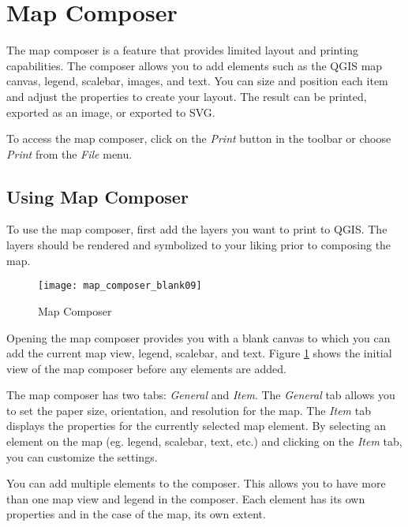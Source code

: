 
\section{Map Composer}\label{label_mapcomposer}

The map composer is a feature that provides limited layout and printing
capabilities. The composer allows you to add elements such as the QGIS map
canvas, legend, scalebar, images, and text. You can size and position each item and
adjust the properties to create your layout. The result can be printed,
exported as an image, or exported to SVG.

To access the map composer, click on the \textit{Print} button in the toolbar
or choose \textit{Print} from the \textit{File} menu.

\subsection{Using Map Composer}\label{label_usemapcomposer} 

To use the map composer, first add the layers you
want to print to QGIS. The layers should be rendered and symbolized to your
liking prior to composing the map. 

\begin{figure}[ht]
   \begin{center}
   \caption{Map Composer}\label{fig:map_composer_blank}\smallskip
   \texttt{[image: map\_composer\_blank09]}
\end{center}  
\end{figure}

Opening the map composer provides you with a blank canvas to which you can add
the current map view, legend, scalebar, and text. Figure
\ref{fig:map_composer_blank} shows the initial view of the map composer before
any elements are added.

The map composer has two tabs: \textit{General} and \textit{Item}. The
\textit{General} tab allows you to set the paper size, orientation, and
resolution for the map. The \textit{Item} tab displays the properties for the
currently selected map element. By selecting an element on the map (eg.
legend, scalebar, text, etc.) and clicking on the \textit{Item} tab, you can
customize the settings.

You can add multiple elements to the composer. This allows you to have more
than one map view and legend in the composer. Each element has its own
properties and in the case of the map, its own extent.

